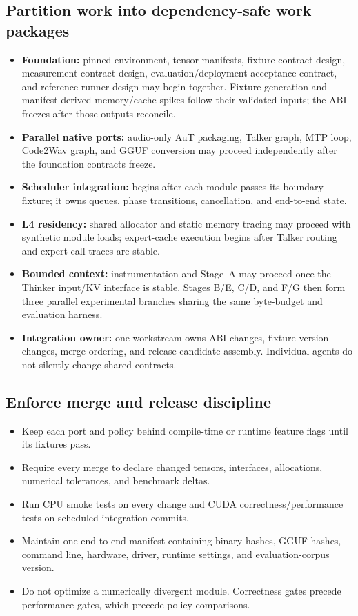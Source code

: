 \documentclass[10pt,letterpaper]{article}
\begin{document}
\subsection{Partition work into dependency-safe work packages}
\begin{itemize}
    \item \textbf{Foundation:} pinned environment, tensor manifests, fixture-contract design, measurement-contract design, evaluation/deployment acceptance contract, and reference-runner design may begin together. Fixture generation and manifest-derived memory/cache spikes follow their validated inputs; the ABI freezes after those outputs reconcile.
    \item \textbf{Parallel native ports:} audio-only AuT packaging, Talker graph, MTP loop, Code2Wav graph, and GGUF conversion may proceed independently after the foundation contracts freeze.
    \item \textbf{Scheduler integration:} begins after each module passes its boundary fixture; it owns queues, phase transitions, cancellation, and end-to-end state.
    \item \textbf{L4 residency:} shared allocator and static memory tracing may proceed with synthetic module loads; expert-cache execution begins after Talker routing and expert-call traces are stable.
    \item \textbf{Bounded context:} instrumentation and Stage~A may proceed once the Thinker input/KV interface is stable. Stages B/E, C/D, and F/G then form three parallel experimental branches sharing the same byte-budget and evaluation harness.
    \item \textbf{Integration owner:} one workstream owns ABI changes, fixture-version changes, merge ordering, and release-candidate assembly. Individual agents do not silently change shared contracts.
\end{itemize}

\subsection{Enforce merge and release discipline}
\begin{itemize}
    \item Keep each port and policy behind compile-time or runtime feature flags until its fixtures pass.
    \item Require every merge to declare changed tensors, interfaces, allocations, numerical tolerances, and benchmark deltas.
    \item Run CPU smoke tests on every change and CUDA correctness/performance tests on scheduled integration commits.
    \item Maintain one end-to-end manifest containing binary hashes, GGUF hashes, command line, hardware, driver, runtime settings, and evaluation-corpus version.
    \item Do not optimize a numerically divergent module. Correctness gates precede performance gates, which precede policy comparisons.
\end{itemize}
\end{document}
